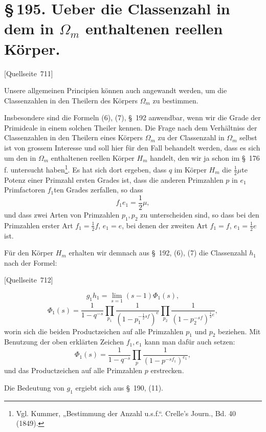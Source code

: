 \documentclass[11pt]{article}
\newcommand{\srcpage}[1]{\par\medskip\noindent\textsf{[Quellseite~#1]}\par\smallskip}
\begin{document}
\section*{\S\,195. Ueber die Classenzahl in dem in $\Omega_m$ enthaltenen reellen Körper.}

\srcpage{711}
Unsere allgemeinen Principien können auch angewandt werden, um die Classenzahlen in den Theilern des Körpers $\Omega_m$ zu bestimmen.

Insbesondere sind die Formeln (6), (7), \S~192 anwendbar, wenn wir die Grade der Primideale in einem solchen Theiler kennen. Die Frage nach dem Verhältniss der Classenzahlen in den Theilern eines Körpers $\Omega_m$ zu der Classenzahl in $\Omega_m$ selbst ist von grossem Interesse und soll hier für den Fall behandelt werden, dass es sich um den in $\Omega_m$ enthaltenen reellen Körper $H_m$ handelt, den wir ja schon im \S~176 f. untersucht haben\footnote{Vgl. Kummer, „Bestimmung der Anzahl u.s.f.“. Crelle's Journ., Bd. 40 (1849).}. Es hat sich dort ergeben, dass $q$ im Körper $H_m$ die $\frac12\mu$te Potenz einer Primzahl ersten Grades ist, dass die anderen Primzahlen $p$ in $e_1$ Primfactoren $f_1$ten Grades zerfallen, so dass
\begin{equation}
f_1e_1=\frac12\mu,
\tag{1}
\end{equation}
und dass zwei Arten von Primzahlen $p_1,p_2$ zu unterscheiden sind, so dass bei den Primzahlen erster Art $f_1=\frac12 f$, $e_1=e$, bei denen der zweiten Art $f_1=f$, $e_1=\frac12 e$ ist.

Für den Körper $H_m$ erhalten wir demnach aus \S~192, (6), (7) die Classenzahl $h_1$ nach der Formel:
\srcpage{712}
\begin{equation}
g_1h_1=\lim_{s=1}(s-1)\Phi_1(s),
\tag{2}
\end{equation}
\begin{equation}
\Phi_1(s)=\frac1{1-q^{-s}}\prod_{p_1}\frac1{(1-p_1^{-\frac12sf})^e}\prod_{p_2}\frac1{(1-p_2^{-sf})^{\frac12e}},
\tag{3}
\end{equation}
worin sich die beiden Productzeichen auf alle Primzahlen $p_1$ und $p_2$ beziehen. Mit Benutzung der oben erklärten Zeichen $f_1,e_1$ kann man dafür auch setzen:
\begin{equation}
\Phi_1(s)=\frac1{1-q^{-s}}\prod_p\frac1{(1-p^{-sf_1})^{e_1}},
\tag{4}
\end{equation}
und das Productzeichen auf alle Primzahlen $p$ erstrecken.

Die Bedeutung von $g_1$ ergiebt sich aus \S~190, (11).
\end{document}
